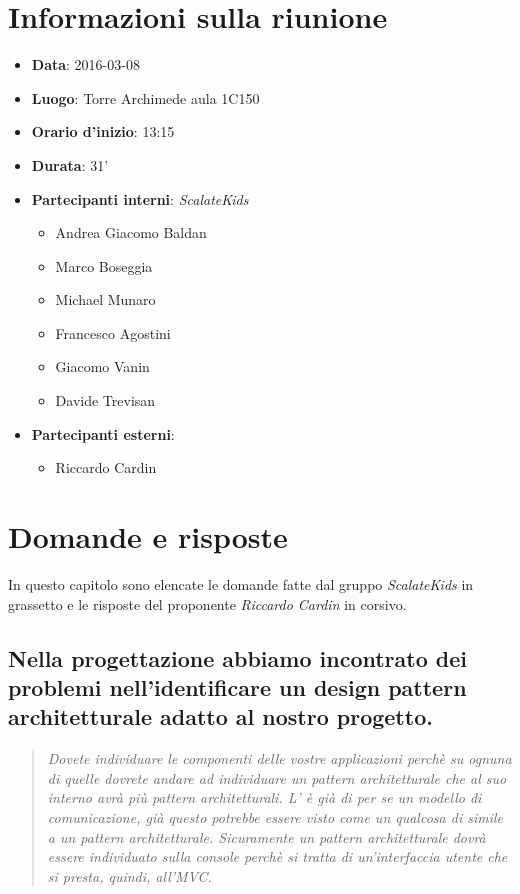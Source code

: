 \documentclass{scalatekids-article}
\begin{document}
\section{Informazioni sulla riunione}
\begin{itemize}
\item \textbf{Data}: 2016-03-08
\item \textbf{Luogo}: Torre Archimede aula 1C150
\item \textbf{Orario d'inizio}: 13:15
\item \textbf{Durata}: 31'
\item \textbf{Partecipanti interni}: \textit{ScalateKids}
  \begin{itemize}
  \item Andrea Giacomo Baldan 
  \item Marco Boseggia
  \item Michael Munaro
  \item Francesco Agostini
  \item Giacomo Vanin
  \item Davide Trevisan
  \end{itemize}
\item \textbf{Partecipanti esterni}:
  \begin{itemize}
  \item Riccardo Cardin
  \end{itemize}
\end{itemize}
\section{Domande e risposte}
In questo capitolo sono elencate le domande fatte dal gruppo \textit{ScalateKids} in grassetto e le risposte del proponente \textit{Riccardo Cardin} in corsivo.
\subsection{Nella progettazione abbiamo incontrato dei problemi nell'identificare un design pattern architetturale adatto al nostro progetto. }
\begin{quote}
  \textit{Dovete individuare le componenti delle vostre applicazioni perchè su ognuna di quelle dovrete andare ad individuare un pattern architetturale che al suo interno avrà più pattern architetturali.
  L' è già di per se un modello di comunicazione, già questo potrebbe essere visto come un qualcosa di simile a un pattern architetturale. Sicuramente un pattern architetturale dovrà essere 
  individuato sulla console perchè si tratta di un'interfaccia utente che si presta, quindi, all'MVC.\\}
\end{quote}
\end{document}
